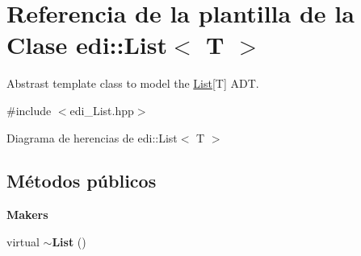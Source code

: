 \hypertarget{classedi_1_1List}{\section{Referencia de la plantilla de la Clase edi\+:\+:List$<$ T $>$}
\label{classedi_1_1List}
}


Abstrast template class to model the \hyperlink{classedi_1_1List}{List}\mbox{[}T\mbox{]} A\+D\+T.  




{\ttfamily \#include $<$edi\+\_\+\+List.\+hpp$>$}



Diagrama de herencias de edi\+:\+:List$<$ T $>$
\subsection*{Métodos públicos}
\begin{Indent}{\bf Makers}\par
\begin{DoxyCompactItemize}
\item 
\hypertarget{classedi_1_1List_a580693c36c4803aad8d178f1a2305410}{virtual {\bfseries $\sim$\+List} ()}\label{classedi_1_1List_a580693c36c4803aad8d178f1a2305410}

\end{DoxyCompactItemize}
\end{Indent}
